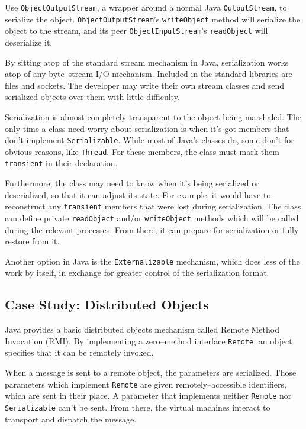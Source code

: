 	Use \texttt{Obj\-ect\-Outp\-utStr\-eam}\cite{java-api}, a wrapper around a normal Java \texttt{Out\-p\-ut\-Str\-eam}, to serialize the object.  \texttt{Obj\-ect\-Outp\-utStr\-eam}'s \texttt{writeObject} method will serialize the object to the stream, and its peer \texttt{Obj\-ect\-Inp\-utStr\-eam}'s \texttt{readObject} will deserialize it.

	By sitting atop of the standard stream mechanism in Java, serialization works atop of any byte--stream I/O mechanism.  Included in the standard libraries are files and sockets.  The developer may write their own stream classes and send serialized objects over them with little difficulty.

	Serialization is almost completely transparent to the object being marshaled.  The only time a class need worry about serialization is when it's got members that don't implement \texttt{Serializable}.  While most of Java's classes do, some don't for obvious reasons, like \texttt{Thread}.  For these members, the class must mark them \texttt{transient} in their declaration.

	Furthermore, the class may need to know when it's being serialized or deserialized, so that it can adjust its state.  For example, it would have to reconstruct any \texttt{transient} members that were lost during serialization.  The class can define private \texttt{readObject} and/or \texttt{writeObject} methods which will be called during the relevant processes.  From there, it can prepare for serialization or fully restore from it.

	Another option in Java is the \texttt{Externalizable} mechanism, which does less of the work by itself, in exchange for greater control of the serialization format.


\subsection{Case Study: Distributed Objects}
  Java provides a basic distributed objects mechanism called Remote Method Invocation (RMI)\cite{java-rmi}.  By implementing a zero--method interface \texttt{Remote}, an object specifies that it can be remotely invoked.  

  When a message is sent to a remote object, the parameters are serialized.  Those parameters which implement \texttt{Remote} are given remotely--accessible identifiers, which are sent in their place.  A parameter that implements neither \texttt{Remote} nor \texttt{Serializable} can't be sent.  From there, the virtual machines interact to transport and dispatch the message.


  
